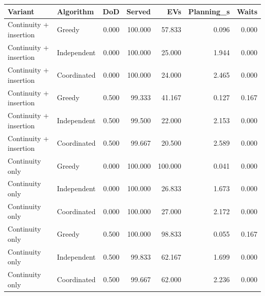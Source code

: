 \begin{tabular}{llrrrrr}
\toprule
Variant & Algorithm & DoD & Served & EVs & Planning\_s & Waits \\
\midrule
Continuity + insertion & Greedy & 0.000 & 100.000 & 57.833 & 0.096 & 0.000 \\
Continuity + insertion & Independent & 0.000 & 100.000 & 25.000 & 1.944 & 0.000 \\
Continuity + insertion & Coordinated & 0.000 & 100.000 & 24.000 & 2.465 & 0.000 \\
Continuity + insertion & Greedy & 0.500 & 99.333 & 41.167 & 0.127 & 0.167 \\
Continuity + insertion & Independent & 0.500 & 99.500 & 22.000 & 2.153 & 0.000 \\
Continuity + insertion & Coordinated & 0.500 & 99.667 & 20.500 & 2.589 & 0.000 \\
Continuity only & Greedy & 0.000 & 100.000 & 100.000 & 0.041 & 0.000 \\
Continuity only & Independent & 0.000 & 100.000 & 26.833 & 1.673 & 0.000 \\
Continuity only & Coordinated & 0.000 & 100.000 & 27.000 & 2.172 & 0.000 \\
Continuity only & Greedy & 0.500 & 100.000 & 98.833 & 0.055 & 0.167 \\
Continuity only & Independent & 0.500 & 99.833 & 62.167 & 1.699 & 0.000 \\
Continuity only & Coordinated & 0.500 & 99.667 & 62.000 & 2.236 & 0.000 \\
\bottomrule
\end{tabular}
